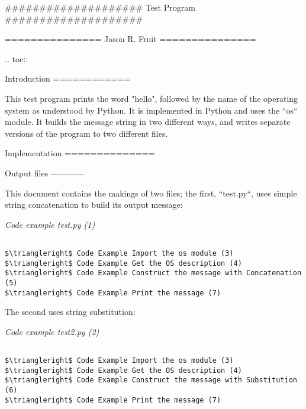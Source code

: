 ####################
Test Program
####################

===============
Jason R. Fruit
===============

..  toc::


Introduction
============

This test program prints the word "hello", followed by the name of
the operating system as understood by Python.  It is implemented in
Python and uses the ``os`` module.  It builds the message string
in two different ways, and writes separate versions of the program to
two different files.

Implementation
==============

Output files
------------

This document contains the makings of two files; the first,
``test.py``, uses simple string concatenation to build its output
message:

\label{pyweb1}
    \begin{flushleft}
    \textit{Code example test.py (1)}
    \begin{Verbatim}[commandchars=\\\{\},codes={\catcode`$=3\catcode`^=7},frame=single]

$\triangleright$ Code Example Import the os module (3)
$\triangleright$ Code Example Get the OS description (4)
$\triangleright$ Code Example Construct the message with Concatenation (5)
$\triangleright$ Code Example Print the message (7)

    \end{Verbatim}
    
    \end{flushleft}


The second uses string substitution:

\label{pyweb2}
    \begin{flushleft}
    \textit{Code example test2.py (2)}
    \begin{Verbatim}[commandchars=\\\{\},codes={\catcode`$=3\catcode`^=7},frame=single]

$\triangleright$ Code Example Import the os module (3)
$\triangleright$ Code Example Get the OS description (4)
$\triangleright$ Code Example Construct the message with Substitution (6)
$\triangleright$ Code Example Print the message (7)

    \end{Verbatim}
    
    \end{flushleft}


